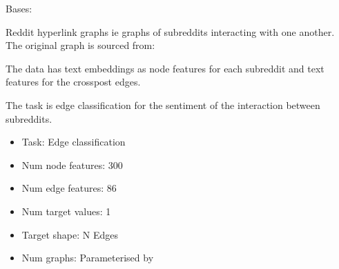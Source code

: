 \documentclass[letterpaper,10pt,english]{sphinxhowto}
\begin{document}
\begin{fulllineitems}
\label{\detokenize{datasets:datasets.RedditDataset}}
\pysigstartsignatures
{}
\pysigstopsignatures
\sphinxAtStartPar
Bases: 

\sphinxAtStartPar
Reddit hyperlink graphs \sphinxhyphen{} ie graphs of subreddits interacting with one another.
The original graph is sourced from:
\begin{quote}

\sphinxAtStartPar
{}
\end{quote}

\sphinxAtStartPar
The data has text embeddings as node features for each subreddit and text features for the cross\sphinxhyphen{}post edges.

\sphinxAtStartPar
The task is edge classification for the sentiment of the interaction between subreddits.
\begin{itemize}
\item {} 
\sphinxAtStartPar
Task: Edge classification

\item {} 
\sphinxAtStartPar
Num node features: 300

\item {} 
\sphinxAtStartPar
Num edge features: 86

\item {} 
\sphinxAtStartPar
Num target values: 1

\item {} 
\sphinxAtStartPar
Target shape: N Edges

\item {} 
\sphinxAtStartPar
Num graphs: Parameterised by 


\end{itemize}
\end{fulllineitems}
\end{document}
